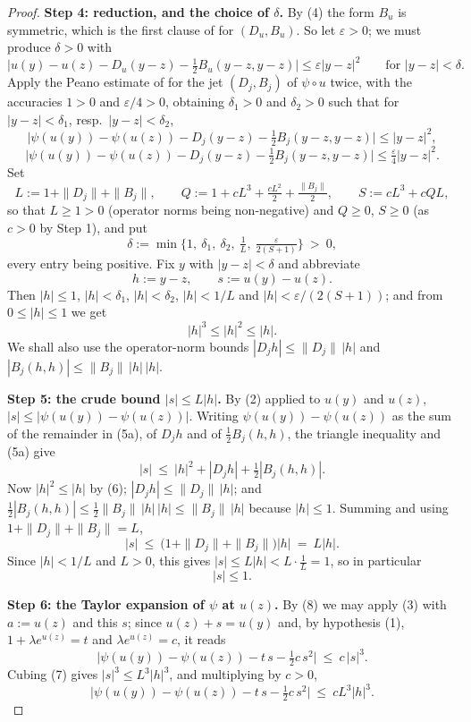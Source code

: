 \begin{proof}
\medskip\noindent\textbf{Step 4: reduction, and the choice of $\delta$.} By (4) the form
$B_u$ is symmetric, which is the first clause of  for $(D_u,B_u)$. So
let $\varepsilon>0$; we must produce $\delta>0$ with
\[
 \Big|u(y)-u(z)-D_u(y-z)-\tfrac12B_u(y-z,y-z)\Big|\le\varepsilon|y-z|^{2}
 \qquad\text{for }|y-z|<\delta. \tag{4}
\]
Apply the Peano estimate of  for the jet $(D_j,B_j)$ of $\psi\circ u$
twice, with the accuracies $1>0$ and $\varepsilon/4>0$, obtaining $\delta_1>0$ and
$\delta_2>0$ such that for $|y-z|<\delta_1$, resp.\ $|y-z|<\delta_2$,
\[
 \Big|\psi(u(y))-\psi(u(z))-D_j(y-z)-\tfrac12B_j(y-z,y-z)\Big|\le|y-z|^{2},
 \tag{5a}
\]
\[
 \Big|\psi(u(y))-\psi(u(z))-D_j(y-z)-\tfrac12B_j(y-z,y-z)\Big|
  \le\tfrac\varepsilon4|y-z|^{2} .
 \tag{5b}
\]
Set
\[
 L:=1+\|D_j\|+\|B_j\|,\qquad
 Q:=1+cL^{3}+\tfrac{cL^{2}}2+\tfrac{\|B_j\|}2,\qquad
 S:=cL^{3}+cQL ,
\]
so that $L\ge1>0$ (operator norms being non-negative) and $Q\ge0$, $S\ge0$ (as $c>0$ by
Step 1), and put
\[
 \delta:=\min\Big\{1,\ \delta_1,\ \delta_2,\ \tfrac1L,\
   \tfrac{\varepsilon}{2(S+1)}\Big\}\ >\ 0 ,
\]
every entry being positive. Fix $y$ with $|y-z|<\delta$ and abbreviate
\[
 h:=y-z,\qquad s:=u(y)-u(z).
\]
Then $|h|\le1$, $|h|<\delta_1$, $|h|<\delta_2$, $|h|<1/L$ and
$|h|<\varepsilon/(2(S+1))$; and from $0\le|h|\le1$ we get
\[
 |h|^{3}\le|h|^{2}\le|h| . \tag{6}
\]
We shall also use the operator-norm bounds $|D_jh|\le\|D_j\|\,|h|$ and
$|B_j(h,h)|\le\|B_j\|\,|h|\,|h|$.

\medskip\noindent\textbf{Step 5: the crude bound $|s|\le L|h|$.} By (2) applied to $u(y)$
and $u(z)$, $|s|\le|\psi(u(y))-\psi(u(z))|$. Writing
$\psi(u(y))-\psi(u(z))$ as the sum of the remainder in (5a), of $D_jh$ and of
$\frac12B_j(h,h)$, the triangle inequality and (5a) give
\[
 |s|\ \le\ |h|^{2}+|D_jh|+\tfrac12|B_j(h,h)| .
\]
Now $|h|^{2}\le|h|$ by (6); $|D_jh|\le\|D_j\|\,|h|$; and
$\frac12|B_j(h,h)|\le\frac12\|B_j\|\,|h|\,|h|\le\|B_j\|\,|h|$ because $|h|\le1$. Summing and
using $1+\|D_j\|+\|B_j\|=L$,
\[
 |s|\ \le\ \big(1+\|D_j\|+\|B_j\|\big)|h|\ =\ L|h| . \tag{7}
\]
Since $|h|<1/L$ and $L>0$, this gives $|s|\le L|h|<L\cdot\frac1L=1$, so in particular
\[
 |s|\le1 . \tag{8}
\]

\medskip\noindent\textbf{Step 6: the Taylor expansion of $\psi$ at $u(z)$.} By (8) we may
apply (3) with $a:=u(z)$ and this $s$; since $u(z)+s=u(y)$ and, by hypothesis (1),
$1+\lambda e^{u(z)}=t$ and $\lambda e^{u(z)}=c$, it reads
\[
 \Big|\psi(u(y))-\psi(u(z))-t\,s-\tfrac12c\,s^{2}\Big|\ \le\ c\,|s|^{3} .
\]
Cubing (7) gives $|s|^{3}\le L^{3}|h|^{3}$, and multiplying by $c>0$,
\[
 \Big|\psi(u(y))-\psi(u(z))-t\,s-\tfrac12c\,s^{2}\Big|\ \le\ cL^{3}|h|^{3} . \tag{9}
\]


\end{proof}
